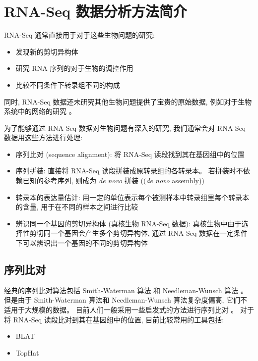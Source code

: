 \section{RNA-Seq 数据分析方法简介}
RNA-Seq 通常直接用于对于这些生物问题的研究:
\begin{itemize}
\item 发现新的剪切异构体 \cite{merkin2012evolutionary, wang2010novo, roberts2011identification, wang2010mapsplice}

\item 研究 RNA 序列的对于生物的调控作用 \cite{van2011xuts}

\item 比较不同条件下转录组不同的构成 \cite{trapnell2012differential}
\end{itemize}
同时, RNA-Seq 数据还未研究其他生物问题提供了宝贵的原始数据, 
例如对于生物系统中的网络的研究 \cite{sinicropi2012whole}。 

为了能够通过 RNA-Seq 数据对生物问题有深入的研究, 
我们通常会对 RNA-Seq 数据用这些方法进行处理:
\begin{itemize}
\item 序列比对 (sequence alignment): 将 RNA-Seq 读段找到其在基因组中的位置

\item 序列拼装: 
直接将 RNA-Seq 读段拼装成原转录组的各转录本。 若拼装时不依赖已知的参考序列, 
则成为 \textit{de novo} 拼装 ((\textit{de novo} assembly)) 

\item 转录本的表达量估计: 用一定的单位表示每个被测样本中转录组里每个转录本的含量, 
用于在不同的样本之间进行比较

\item 辨识同一个基因的剪切异构体 (真核生物 RNA-Seq 数据): 真核生物中由于选择性剪切同一个基因会产生多个剪切异构体, 
通过 RNA-Seq 数据在一定条件下可以辨识出一个基因的不同的剪切异构体
\end{itemize}

\subsection{序列比对}
经典的序列比对算法包括 Smith-Waterman 算法 \cite{SmithWaterman1981} 和 Needleman-Wunsch 算法 \cite{needleman1970general}。 
但是由于 Smith-Waterman 算法和 Needleman-Wunsch 算法复杂度偏高, 它们不适用于大规模的数据。 
目前人们一般采用一些启发式的方法进行序列比对 \cite{isaev2004introduction}。 
对于将 RNA-Seq 读段比对到其在基因组中的位置, 目前比较常用的工具包括: 
\begin{itemize}
\item BLAT \cite{kent2002blat}
\item TopHat \cite{trapnell2009tophat}
\end{itemize}

